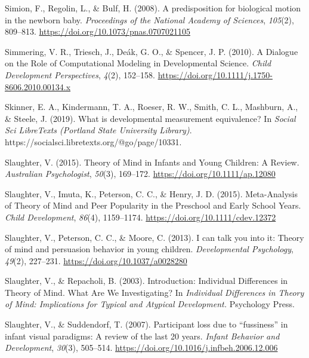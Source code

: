 \documentclass[
]{scrbook}
\newlength{\cslhangindent}
\newenvironment{CSLReferences}[2] %
 {\begin{list}{}{%
  \setlength{\itemindent}{0pt}
  \setlength{\leftmargin}{0pt}
  \setlength{\parsep}{0pt}
  \ifodd #1
   \setlength{\leftmargin}{\cslhangindent}
   \setlength{\itemindent}{-1\cslhangindent}
  \fi
  \setlength{\itemsep}{#2\baselineskip}}}
 {\end{list}}
\begin{document}
\begin{CSLReferences}{1}{0}
Simion, F., Regolin, L., \& Bulf, H. (2008). A predisposition for biological motion in the newborn baby. \emph{Proceedings of the National Academy of Sciences}, \emph{105}(2), 809--813. \url{https://doi.org/10.1073/pnas.0707021105}

Simmering, V. R., Triesch, J., Deák, G. O., \& Spencer, J. P. (2010). A {Dialogue} on the {Role} of {Computational Modeling} in {Developmental Science}. \emph{Child Development Perspectives}, \emph{4}(2), 152--158. \url{https://doi.org/10.1111/j.1750-8606.2010.00134.x}

Skinner, E. A., Kindermann, T. A., Roeser, R. W., Smith, C. L., Mashburn, A., \& Steele, J. (2019). What is developmental measurement equivalence? In \emph{Social Sci LibreTexts (Portland State University Library)}. https://socialsci.libretexts.org/@go/page/10331.

Slaughter, V. (2015). Theory of {Mind} in {Infants} and {Young Children}: {A Review}. \emph{Australian Psychologist}, \emph{50}(3), 169--172. \url{https://doi.org/10.1111/ap.12080}

Slaughter, V., Imuta, K., Peterson, C. C., \& Henry, J. D. (2015). Meta-{Analysis} of {Theory} of {Mind} and {Peer Popularity} in the {Preschool} and {Early School Years}. \emph{Child Development}, \emph{86}(4), 1159--1174. \url{https://doi.org/10.1111/cdev.12372}

Slaughter, V., Peterson, C. C., \& Moore, C. (2013). I can talk you into it: {Theory} of mind and persuasion behavior in young children. \emph{Developmental Psychology}, \emph{49}(2), 227--231. \url{https://doi.org/10.1037/a0028280}

Slaughter, V., \& Repacholi, B. (2003). Introduction: {Individual Differences} in {Theory} of {Mind}. {What Are We Investigating}? In \emph{Individual {Differences} in {Theory} of {Mind}: {Implications} for {Typical} and {Atypical Development}.} Psychology Press.

Slaughter, V., \& Suddendorf, T. (2007). Participant loss due to {``fussiness''} in infant visual paradigms: {A} review of the last 20 years. \emph{Infant Behavior and Development}, \emph{30}(3), 505--514. \url{https://doi.org/10.1016/j.infbeh.2006.12.006}


\end{CSLReferences}
\end{document}
